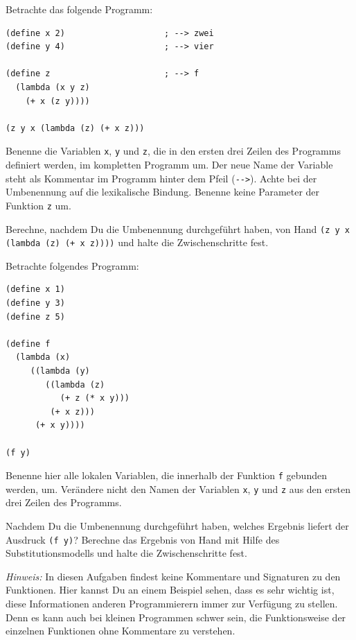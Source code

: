 \begin{aufgabe}

  Betrachte das folgende Programm:

\begin{lstlisting}
(define x 2)                    ; --> zwei
(define y 4)                    ; --> vier

(define z                       ; --> f
  (lambda (x y z)
    (+ x (z y))))

(z y x (lambda (z) (+ x z)))
\end{lstlisting}
%
  Benenne die Variablen \lstinline{x}, \lstinline{y} und \lstinline{z}, die in
  den ersten drei Zeilen des Programms definiert werden, im kompletten
  Programm um. Der neue Name der Variable steht als Kommentar im
  Programm hinter dem Pfeil (\lstinline{-->}).  Achte bei der
  Umbenennung auf die lexikalische Bindung.  Benenne keine
  Parameter der Funktion \lstinline{z} um.

  Berechne, nachdem Du die Umbenennung durchgeführt haben, von
  Hand \lstinline{(z y x}
  \lstinline{(lambda (z) (+ x z))))} und halte die Zwischenschritte
  fest.

\end{aufgabe}

\begin{aufgabe}
  Betrachte folgendes Programm:

\begin{lstlisting}
(define x 1)
(define y 3)
(define z 5)

(define f
  (lambda (x)   
     ((lambda (y)
        ((lambda (z)
           (+ z (* x y)))
         (+ x z)))
      (+ x y))))

(f y)
\end{lstlisting}

  Benenne hier alle lokalen Variablen, die innerhalb der Funktion
  \lstinline{f} gebunden werden, um. Verändere nicht den Namen der
  Variablen \lstinline{x}, \lstinline{y} und \lstinline{z} aus den ersten drei Zeilen
  des Programms.

  Nachdem Du die Umbenennung durchgeführt haben, welches Ergebnis liefert
  der Ausdruck \lstinline{(f y)}? Berechne das Ergebnis von Hand mit Hilfe
  des Substitutionsmodells und halte die Zwischenschritte fest.

  \noindent \emph{Hinweis:} In diesen Aufgaben findest keine
  Kommentare und Signaturen zu den Funktionen. Hier kannst Du an einem
  Beispiel sehen, dass es sehr wichtig ist, diese Informationen
  anderen Programmierern immer zur Verfügung zu stellen. Denn es kann
  auch bei kleinen Programmen schwer sein, die Funktionsweise der
  einzelnen Funktionen ohne Kommentare zu verstehen.
\end{aufgabe}

